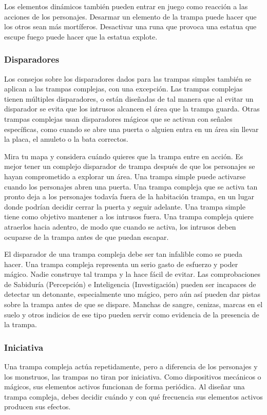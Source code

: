 \documentclass[a4paper,twocolumn,openany,10pt]{dndbook}
\begin{document}
Los elementos dinámicos también pueden entrar en juego como reacción a las acciones de los personajes. Desarmar un elemento de
la trampa puede hacer que los otros sean más mortíferos. Desactivar una runa que provoca una estatua que escupe fuego puede
hacer que la estatua explote. 

\subsubsection*{Disparadores}
Los consejos sobre los disparadores dados para las trampas simples también se aplican a las trampas complejas, con una
excepción. Las trampas complejas tienen múltiples disparadores, o están diseñadas de tal manera que al evitar un disparador se
evita que los intrusos alcancen el área que la trampa guarda. Otras trampas complejas usan disparadores mágicos que se activan
con señales específicas, como cuando se abre una puerta o alguien entra en un área sin llevar la placa, el amuleto o la bata
correctos.

Mira tu mapa y considera cuándo quieres que la trampa entre en acción. Es mejor tener un complejo disparador de trampa después
de que los personajes se hayan comprometido a explorar un área. Una trampa simple puede activarse cuando los personajes abren
una puerta. Una trampa compleja que se activa tan pronto deja a los personajes todavía fuera de la habitación trampa, en un
lugar donde podrían decidir cerrar la puerta y seguir adelante. Una trampa simple tiene como objetivo mantener a los intrusos
fuera. Una trampa compleja quiere atraerlos hacia adentro, de modo que cuando se activa, los intrusos deben ocuparse de la
trampa antes de que puedan escapar.

El disparador de una trampa compleja debe ser tan infalible como se pueda hacer. Una trampa compleja representa un serio gasto
de esfuerzo y poder mágico. Nadie construye tal trampa y la hace fácil de evitar. Las comprobaciones de Sabiduría (Percepción) e
Inteligencia (Investigación) pueden ser incapaces de detectar un detonante, especialmente uno mágico, pero aún así pueden dar
pistas sobre la trampa antes de que se dispare. Manchas de sangre, cenizas, marcas en el suelo y otros indicios de ese tipo
pueden servir como evidencia de la presencia de la trampa. 

\subsubsection*{Iniciativa}
Una trampa compleja actúa repetidamente, pero a diferencia de los personajes y los monstruos, las trampas no tiran por
iniciativa. Como dispositivos mecánicos o mágicos, sus elementos activos funcionan de forma periódica. Al diseñar una trampa
compleja, debes decidir cuándo y con qué frecuencia sus elementos activos producen sus efectos.
\end{document}
